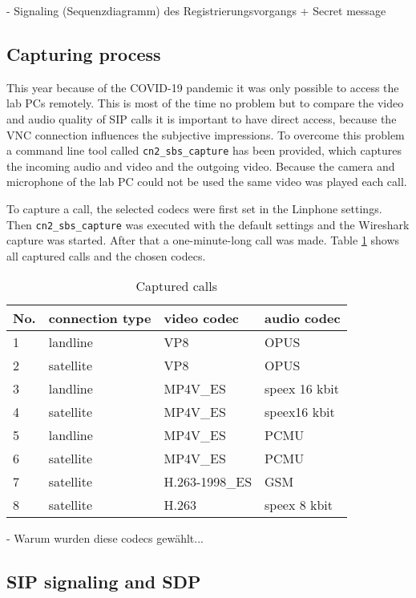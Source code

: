 \documentclass[parskip=full]{scrartcl}
\begin{document}
- Signaling (Sequenzdiagramm) des Registrierungsvorgangs + Secret message 
\subsection{Capturing process} \label{subsec:capture}
This year because of the COVID-19 pandemic it was only possible to access the lab PCs remotely.
This is most of the time no problem but to compare the video and audio quality of SIP calls it is important to have direct access, because the VNC connection influences the subjective impressions.
To overcome this problem a command line tool called \verb|cn2_sbs_capture| has been provided, which captures the incoming audio and video and the outgoing video.
Because the camera and microphone of the lab PC could not be used the same video was played each call.

To capture a call, the selected codecs were first set in the Linphone settings. 
Then \verb|cn2_sbs_capture| was executed with the default settings and the Wireshark capture was started. 
After that a one-minute-long call was made. 
Table \ref{tab:capture} shows all captured calls and the chosen codecs.

\begin{table}[hb]
	\centering
	\caption{Captured calls}
	\label{tab:capture}
	\begin{tabular}{l|l|l|l}
		\toprule
		\textbf{No.} & \textbf{connection type} & \textbf{video codec} & \textbf{audio codec}  \\ \midrule
		1 & landline & VP8 & OPUS\\
		2 & satellite & VP8 & OPUS\\
		3 & landline & MP4V\_ES & speex 16 kbit\\
		4 & satellite & MP4V\_ES & speex16 kbit\\
		5 & landline & MP4V\_ES & PCMU\\
		6 & satellite & MP4V\_ES & PCMU\\
		7 & satellite & H.263-1998\_ES & GSM\\
		8 & satellite & H.263 & speex 8 kbit\\
		\bottomrule
	\end{tabular}
\end{table}

- Warum wurden diese codecs gewählt...

\subsection{SIP signaling and SDP} \label{subsec:signaling}
\end{document}
